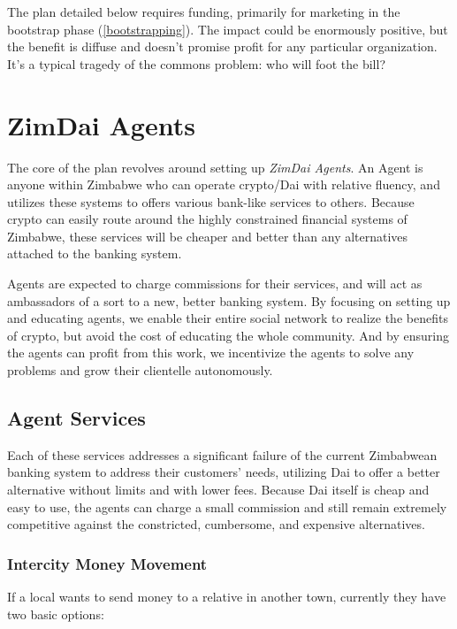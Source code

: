 \documentclass{article}
\begin{document}
The plan detailed below requires funding, primarily for marketing in the bootstrap phase (\ref{bootstrapping}). The impact could be enormously positive, but the benefit is diffuse and doesn't promise profit for any particular organization. It's a typical tragedy of the commons problem: who will foot the bill?

\newpage
\section{ZimDai Agents}  \label{agents}

The core of the plan revolves around setting up \textit{ZimDai Agents}. An Agent is anyone within Zimbabwe who can operate crypto/Dai with relative fluency, and utilizes these systems to offers various bank-like services to others. Because crypto can easily route around the highly constrained financial systems of Zimbabwe, these services will be cheaper and better than any alternatives attached to the banking system.

Agents are expected to charge commissions for their services, and will act as ambassadors of a sort to a new, better banking system. By focusing on setting up and educating agents, we enable their entire social network to realize the benefits of crypto, but avoid the cost of educating the whole community. And by ensuring the agents can profit from this work, we incentivize the agents to solve any problems and grow their clientelle autonomously.

\subsection{Agent Services} \label{services}

Each of these services addresses a significant failure of the current Zimbabwean banking system to address their customers' needs, utilizing Dai to offer a better alternative without limits and with lower fees. Because Dai itself is cheap and easy to use, the agents can charge a small commission and still remain extremely competitive against the constricted, cumbersome, and expensive alternatives.

\subsubsection{Intercity Money Movement} \label{intercity}

If a local wants to send money to a relative in another town, currently they have two basic options:
\end{document}
